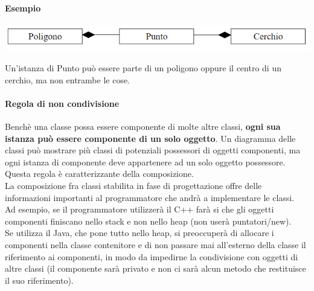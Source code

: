 \documentclass{article}
\begin{document}
	\paragraph*{Esempio}
	\begin{center}
		\includegraphics[scale=0.5]{assets/composizione_punto.png}
	\end{center}
	Un'istanza di Punto può essere parte di un poligono oppure il centro di un cerchio, ma non entrambe le cose.
	\paragraph*{Regola di non condivisione}
	Benchè una classe possa essere componente di molte altre classi, \textbf{ogni sua istanza può essere componente di un solo oggetto}. Un diagramma delle classi può mostrare più classi di potenziali possessori di oggetti componenti, ma ogni istanza di componente deve appartenere ad un solo oggetto possessore. Questa regola è caratterizzante della composizione.
	\vspace{\baselineskip} \\
	La composizione fra classi stabilita in fase di progettazione offre delle informazioni importanti al programmatore che andrà a implementare le classi.\\
	Ad esempio, se il programmatore utilizzerà il C++ farà si che gli oggetti componenti finiscano nello stack e non nello heap (non userà puntatori/new).\\
	Se utilizza il Java, che pone tutto nello heap, si preoccuperà di allocare i componenti nella classe contenitore e di non passare mai all'esterno della classe il riferimento ai componenti, in modo da impedirne la condivisione con oggetti di altre classi (il componente sarà privato e non ci sarà alcun metodo che restituisce il suo riferimento).
	
\end{document}
